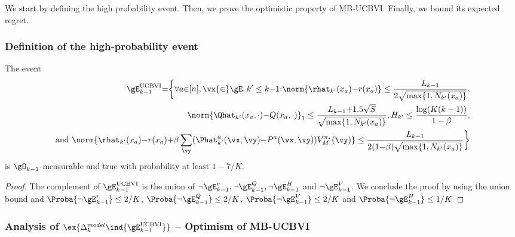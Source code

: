 We start by defining the high probability event. Then, we prove the optimistic property of MB-UCBVI. Finally, we bound its expected regret.

\subsubsection{Definition of the high-probability event}

\begin{lem}
    \label{lem:concentration_ucbvi}
    The event
    \begin{align*}
        \gE^\text{UCBVI}_{k-1} {=}\bigg\{ \forall a{\in}[n], \vx{\in}\gE, k'\le k{-}1{:}
            \norm{\rhat_{k'}(x_a){-}r(x_a)} \le\frac{L_{k-1}}{2\sqrt{\max\{1,N_{k'}(x_a)\} }}, \\
            \norm{\Qhat_{k'}(x_a,\cdot) {-}Q(x_a,\cdot)}_1 \le\frac{L_{k-1}{+}1.5\sqrt{S}}{\sqrt{\max\{1,N_{k'}(x_a)\} }}, H_{k'}\le \frac{\log(K(k-1))}{1-\beta}, \\
        \text{ and } \norm{\rhat_{k'}(x_a){-}r(x_a) {+}\beta\sum_{\vy}(\Phat_{k'}^a(\vx,\vy){-}P^a(\vx,\vy))V_M^{\pi_*}(\vy)} \le\frac{L_{k-1}}{2(1{-}\beta)\sqrt{\max\{1,N_{k'}(x_a)\} }} \bigg\}
    \end{align*}
    is $\gO_{k-1}$-measurable and true with probability at least $1-7/K$.
\end{lem}
\begin{proof}
    The complement of $\gE_{k-1}^\text{UCBVI}$ is the union of $\neg \gE_{k-1}^r, \neg \gE_{k-1}^Q, \neg \gE_{k-1}^H$ and $\neg \gE_{k-1}^V$.
    We conclude the proof by using the union bound and $\Proba{\neg \gE_{k-1}^r} \le 2/K$, $\Proba{\neg \gE_{k-1}^Q} \le 2/K$, $\Proba{\neg \gE_{k-1}^V} \le 2/K$ and $\Proba{\neg \gE_{k-1}^H} \le 1/K$
\end{proof}

\subsubsection{Analysis of $\ex{\Delta^{model}_k \ind{\gE_{k-1}^\text{UCBVI}}}$ -- Optimism of MB-UCBVI}

